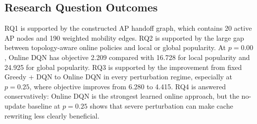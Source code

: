 \subsection{Research Question Outcomes}

RQ1 is supported by the constructed AP handoff graph, which contains 20 active AP nodes and 190 weighted mobility edges. RQ2 is supported by the large gap between topology-aware online policies and local or global popularity. At \(p=0.00\), Online DQN has objective 2.209 compared with 16.728 for local popularity and 24.925 for global popularity. RQ3 is supported by the improvement from fixed Greedy + DQN to Online DQN in every perturbation regime, especially at \(p=0.25\), where objective improves from 6.280 to 4.415. RQ4 is answered conservatively: Online DQN is the strongest learned online approach, but the no-update baseline at \(p=0.25\) shows that severe perturbation can make cache rewriting less clearly beneficial.
